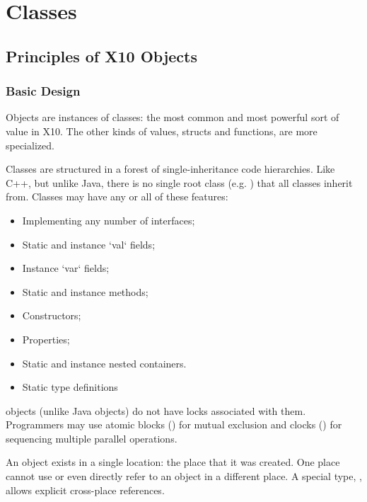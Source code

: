 

\chapter{Classes}
\label{XtenClasses}
\label{ReferenceClasses}





\section{Principles of X10 Objects}\label{XtenObjects}

\subsection{Basic Design}

Objects are instances of classes: the most common and most powerful sort of
value in X10.  The other kinds of values, structs and functions, are more
specialized.%

Classes are structured in a forest of single-inheritance code
hierarchies. Like C++, but unlike Java, there is no single root
class (e.g.{} ) that all classes inherit from.  Classes
may have any or all of these features: 
\begin{itemize}
\item Implementing any number of interfaces;
\item Static and instance \xcd`val` fields; 
\item Instance \xcd`var` fields; 
\item Static and instance methods;
\item Constructors;
\item Properties;
\item Static and instance nested containers.
\item Static type definitions
\end{itemize}


\Xten{} objects (unlike Java objects) do not have locks associated with them.
Programmers may use atomic blocks () for mutual
exclusion and clocks () for sequencing multiple parallel
operations.

An object exists in a single location: the place that it was created.  One
place cannot use or even directly refer to an object in a different place.   A
special type, , allows explicit cross-place references. 

